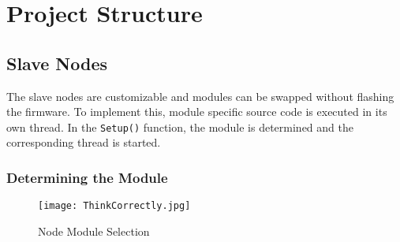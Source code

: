 \section{Project Structure}

    \subsection{Slave Nodes}
    The slave nodes are customizable and modules can be swapped without flashing
    the firmware. To implement this, module specific source code is executed in
    its own thread. In the \texttt{Setup()} function, the module is determined
    and the corresponding thread is started.

        \subsubsection{Determining the Module}

        \begin{figure}[H]
            \centering
            \texttt{[image: ThinkCorrectly.jpg]}
            \caption{Node Module Selection}
            \label{fig:NodeModuleSelection}
        \end{figure}
